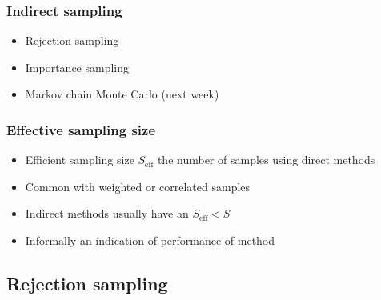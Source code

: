 \documentclass[10pt]{beamer}
\begin{document}
\begin{frame}

\frametitle{Indirect sampling}

  \begin{itemize}
  \item Rejection sampling
  \pause
  \item Importance sampling
  \pause
  \item Markov chain Monte Carlo (next week)
  \end{itemize}

\end{frame}

\begin{frame}

\frametitle{Effective sampling size}

  \begin{itemize}
    \item Efficient sampling size $S_\text{eff}$ the number of samples using direct methods
    \item Common with {\color{uured} weighted} or {\color{uured} correlated} samples
    \pause
    \item Indirect methods usually have an $S_\text{eff} < S$
    \item Informally an indication of performance of method
  \end{itemize}

\end{frame}

\subsection{Rejection sampling}
\frame{\subsectionpage}
\end{document}
